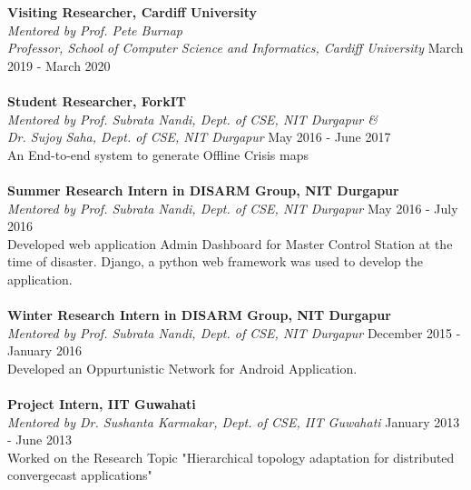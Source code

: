 \documentclass[margin, centered]{res}
\begin{document}
\begin{resume}
\textbf{Visiting Researcher, Cardiff University} \\
\emph{Mentored by Prof. Pete Burnap \\ Professor, School of Computer Science and Informatics, Cardiff University} \hfill March 2019 - March 2020 \\
\\
\textbf{Student Researcher, ForkIT} \\
\emph{Mentored by {Prof. Subrata Nandi, Dept. of CSE, NIT Durgapur} \& \\ {Dr. Sujoy Saha, Dept. of CSE, NIT Durgapur}} \hfill May 2016 - June 2017 \\
An End-to-end system to generate Offline Crisis maps \\
\\
\textbf{Summer Research Intern in DISARM Group, NIT Durgapur} \\
\emph{Mentored by {Prof. Subrata Nandi, Dept. of CSE, NIT Durgapur}} \hfill May 2016 - July 2016 \\
Developed web application Admin Dashboard for Master Control Station at the time of disaster. Django, a python web framework was used to develop the application.\\
\\
\textbf{Winter Research Intern in DISARM Group, NIT Durgapur} \\
\emph{Mentored by {Prof. Subrata Nandi, Dept. of CSE, NIT Durgapur}} \hfill December 2015 - January 2016 \\
Developed an Oppurtunistic Network for Android Application.
\\
\\
\textbf{Project Intern, IIT Guwahati}  \\
\emph{Mentored by {Dr. Sushanta Karmakar, Dept. of CSE, IIT Guwahati}} \hfill January 2013 - June 2013 \\
Worked on the Research Topic "Hierarchical topology adaptation for distributed convergecast applications"



\end{resume}
\end{document}
